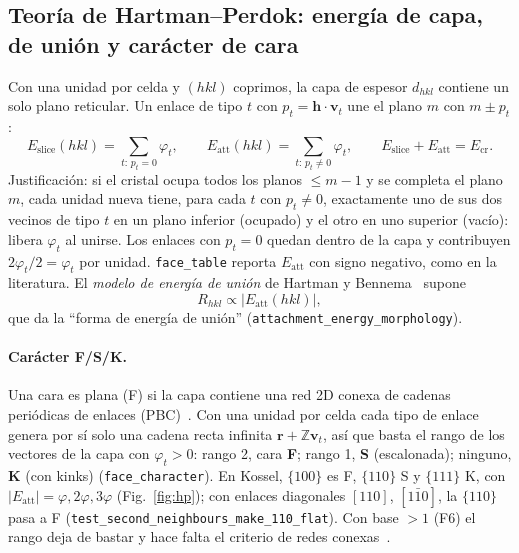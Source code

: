 \documentclass[11pt,a4paper]{article}
\newcommand{\code}[1]{\texttt{#1}}
\newcommand{\vect}[1]{\mathbf{#1}}
\newcommand{\Ecr}{E_{\mathrm{cr}}}
\newcommand{\Eslice}{E_{\mathrm{slice}}}
\newcommand{\Eatt}{E_{\mathrm{att}}}
\begin{document}
\subsection{Teoría de Hartman--Perdok: energía de capa, de unión y carácter de cara}
\label{sec:hp}

Con una unidad por celda y $(hkl)$ coprimos, la capa de espesor $d_{hkl}$ contiene un solo plano
reticular. Un enlace de tipo $t$ con $p_t=\vect h\cdot\vect v_t$ une el plano $m$ con $m\pm p_t$:
\begin{equation}
\Eslice(hkl)=\sum_{t:\,p_t=0}\varphi_t,\qquad
\Eatt(hkl)=\sum_{t:\,p_t\neq0}\varphi_t,\qquad \Eslice+\Eatt=\Ecr .
\label{eq:hp}
\end{equation}
Justificación: si el cristal ocupa todos los planos $\le m-1$ y se completa el plano $m$, cada unidad
nueva tiene, para cada $t$ con $p_t\neq0$, exactamente uno de sus dos vecinos de tipo $t$ en un plano
inferior (ocupado) y el otro en uno superior (vacío): libera $\varphi_t$ al unirse. Los enlaces con
$p_t=0$ quedan dentro de la capa y contribuyen $2\varphi_t/2=\varphi_t$ por unidad. \code{face\_table}
reporta $\Eatt$ con signo negativo, como en la literatura. El \emph{modelo de energía de unión} de
Hartman y Bennema~\cite{hartman1980} supone
\begin{equation}
R_{hkl}\propto|\Eatt(hkl)|,
\label{eq:ratt}
\end{equation}
que da la ``forma de energía de unión'' (\code{attachment\_energy\_morphology}).

\paragraph{Carácter F/S/K.} Una cara es plana (F) si la capa contiene una red 2D conexa de cadenas
periódicas de enlaces (PBC)~\cite{hartman1955}. Con una unidad por celda cada tipo de enlace genera
por sí solo una cadena recta infinita $\vect r+\mathbb Z\vect v_t$, así que basta el rango de los
vectores de la capa con $\varphi_t>0$: rango 2, cara \textbf{F}; rango 1, \textbf{S} (escalonada);
ninguno, \textbf{K} (con kinks) (\code{face\_character}). En Kossel, $\{100\}$ es F, $\{110\}$ S y
$\{111\}$ K, con $|\Eatt|=\varphi,2\varphi,3\varphi$ (Fig.~\ref{fig:hp}); con enlaces diagonales
$[110]$, $[1\bar10]$, la $\{110\}$ pasa a F (\code{test\_second\_neighbours\_make\_110\_flat}). Con base
$>1$ (F6) el rango deja de bastar y hace falta el criterio de redes conexas~\cite{grimbergen1998}.
\end{document}

